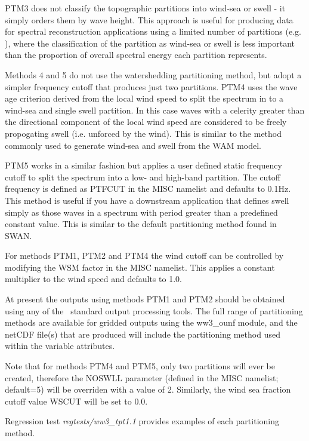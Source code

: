 PTM3 does not classify the topographic partitions into wind-sea or swell - it simply orders
them by wave height. This approach is useful for producing data for spectral reconstruction 
applications using a limited number of partitions (e.g. \cite{pro:BSP13}), where the 
classification of the partition as wind-sea or swell is less important than the proportion
of overall spectral energy each partition represents.

Methods 4 and 5 do not use the watershedding partitioning method, but adopt
a simpler frequency cutoff that produces just two partitions. PTM4 uses the
wave age criterion derived from the local wind speed to split the spectrum in
to a wind-sea and single swell partition. In this case  waves with a celerity greater
than the directional component of the local wind speed are considered to be
freely propogating swell (i.e. unforced by the wind). This is similar to the
method commonly used to generate wind-sea and swell from the WAM model.

PTM5 works in a similar fashion but applies a user defined static frequency
cutoff to split the spectrum into a low- and high-band partition. The cutoff
frequency is defined as PTFCUT in the MISC namelist and defaults to 0.1Hz.
This method is useful if you have a downstream application that defines swell
simply as those waves in a spectrum with period greater than a predefined
constant value. This is similar to the default partitioning method found in SWAN.

For methods PTM1, PTM2 and PTM4 the wind cutoff can be controlled by modifying
the WSM factor in the MISC namelist. This applies a constant multiplier to the 
wind speed and defaults to 1.0.

At present the outputs using methods PTM1 and PTM2 should be obtained using any of the \ws\
standard output processing tools. The full range of partitioning methods are available for
gridded outputs using the ww3\_ounf module, and the netCDF file(s) that are produced will
include the partitioning method used within the variable attributes.

Note that for methods PTM4 and PTM5, only two partitions will ever be created,
therefore the NOSWLL parameter (defined in the MISC namelist; default=5) will
be overriden with a value of 2. Similarly, the wind sea fraction cutoff
value WSCUT will be set to 0.0.

Regression test \emph{regtests/ww3\_tpt1.1} provides examples of each
partitioning method.

